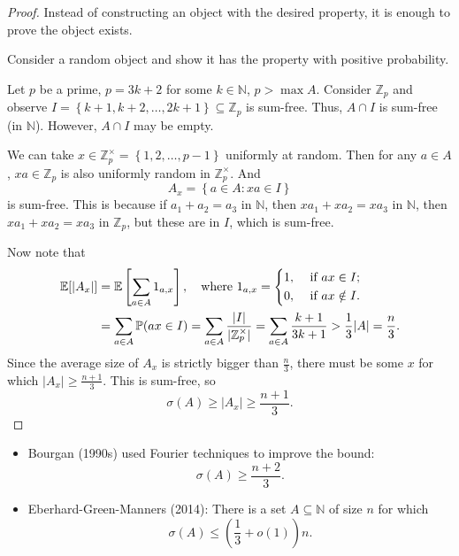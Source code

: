 \begin{proof}
    Instead of constructing an object with the desired property, it is enough to prove the object exists. 

    Consider a random object and show it has the property with positive probability. 

    Let \(p\) be a prime, \(p = 3k + 2\) for some \(k \in \mathbb{N}\), \(p > \max A\). Consider \(\mathbb{Z} _p\) and observe \(I = \left\{ k+1, k+2, \dots , 2k+1 \right\} \subseteq \mathbb{Z} _p\) is sum-free. Thus, \(A \cap I\) is sum-free (in \(\mathbb{N}\)). However, \(A \cap I\) may be empty. 

    We can take \(x \in \mathbb{Z} _p^{\times} = \left\{ 1, 2, \dots , p - 1 \right\} \) uniformly at random. Then for any \(a \in A\), \(x a \in \mathbb{Z} _p\) is also uniformly random in \(\mathbb{Z} _p^{\times}\). And 
    \[
        A_x = \left\{ a \in A: xa \in I \right\} 
    \]          
    is sum-free. This is because if \(a_1 + a_2 = a_3\) in \(\mathbb{N}\), then \(xa_1 + xa_2 = xa_3\) in \(\mathbb{N}\), then \(x a_1 + x a_2 = x a_3\) in \(\mathbb{Z} _p\), but these are in \(I\), which is sum-free. 

    Now note that 
    \begin{align*}
        \mathbb{E} [\vert A_x \vert ] &= \mathbb{E} \left[ \sum_{a \in A} 1_{a, x}  \right], \quad \text{where } 1_{a,x} = \begin{dcases}
            1, &\text{ if } ax \in I ;\\
            0, &\text{ if } ax \notin I.
        \end{dcases}  \\
        &= \sum_{a \in A} \mathbb{P} (ax \in I) = \sum_{a \in A} \frac{\vert I \vert }{\vert \mathbb{Z} _p^{\times} \vert } = \sum_{a \in A} \frac{k + 1}{3k + 1} > \frac{1}{3} \vert A \vert = \frac{n}{3}.    
    \end{align*}     
    Since the average size of \(A_x\) is strictly bigger than \(\frac{n}{3}\), there must be some \(x\) for which \(\vert A_x \vert \ge \frac{n + 1}{3} \). This is sum-free, so 
    \[
        \sigma (A) \ge \vert A_x \vert \ge \frac{n + 1}{3}. 
    \]    
\end{proof}

\begin{remark}
    \quad 
    \begin{itemize}
        \item Bourgan (1990s) used Fourier techniques to improve the bound:
        \[
            \sigma (A) \ge \frac{n + 2}{3}.
        \]
        \item Eberhard-Green-Manners (2014): There is a set \(A \subseteq \mathbb{N}\) of size \(n\) for which 
        \[
            \sigma (A) \le \left( \frac{1}{3} + o(1) \right) n. 
        \]  
    \end{itemize}
\end{remark}

